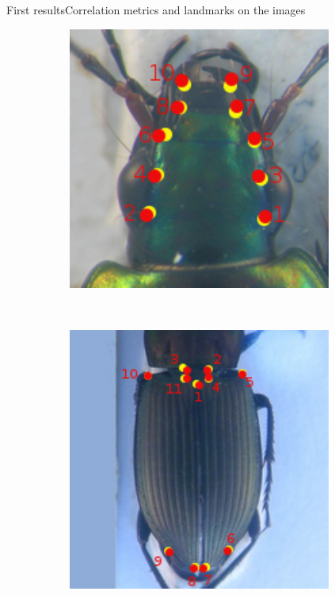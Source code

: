 \documentclass[10pt,svgnames]{beamer}
\begin{document}
\begin{frame}{First results}{Correlation metrics and landmarks on the images}
\begin{itemize}
\begin{figure}[htbp]
    			\begin{subfigure}[t]{0.3\textwidth}
        			\centering
        			\includegraphics[width=0.95\textwidth]{images/Tete_006}
        			\caption*{}
        			\label{figsub22}
    			\end{subfigure}%
    			~ 
    			\begin{subfigure}[t]{0.3\textwidth}
        			\centering
        			\includegraphics[width=0.95\textwidth]{images/Elytre007}
        			\caption*{}
        			\label{figsub22}
    			\end{subfigure} 
    		\end{figure}
   	\end{itemize}
\end{frame}
\end{document}
